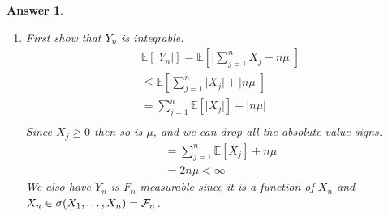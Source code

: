 \documentclass[12pt]{article}
\theoremstyle{colon}
\newtheorem*{answer}{Answer}
\begin{document}
\begin{answer}
  \leavevmode
  \begin{enumerate}[label=\alph*)]
    \item First show that $Y_n$ is integrable.
      \begin{gather*}
        \mathbb{E}[ \lvert Y_n \rvert ] = \mathbb{E}[ \lvert \sum_{j = 1}^n X_j - n \mu \rvert ] \\
        \leq \mathbb{E}[ \sum_{j = 1}^n \lvert X_j \rvert  + \lvert n \mu \rvert ] \\
        = \sum_{j = 1}^n \mathbb{E}[\lvert X_j \rvert] + \lvert n \mu \rvert \\
      \end{gather*}
      Since $X_j \geq 0$ then so is $\mu$, and we can drop all the absolute value signs.
      \begin{gather*}
        = \sum_{j = 1}^n \mathbb{E}[X_j] + n \mu \\
        = 2 n \mu < \infty
      \end{gather*}
      We also have $Y_n$ is $F_n$-measurable since it is a function of $X_n$ and $X_n \in \sigma(X_1, \mathellipsis, X_n) = \mathcal{F}_n$.


\end{enumerate}
\end{answer}
\end{document}
